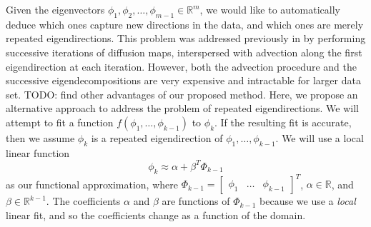\documentclass[preprint]{elsarticle}
\begin{document}
Given the eigenvectors $\phi_1, \phi_2, \dots, \phi_{m-1} \in \mathbb{R}^m$, we would like to automatically deduce which ones capture new directions in the data, and which ones are merely repeated eigendirections. 
%
This problem was addressed previously in \cite{...} by performing successive iterations of diffusion maps, interspersed with advection along the first eigendirection at each iteration. 
%
However, both the advection procedure and the successive eigendecompositions are very expensive and intractable for larger data set. 
TODO: find other advantages of our proposed method. 
%
Here, we propose an alternative approach to address the problem of repeated eigendirections. 
%
We will attempt to fit a function $f(\phi_1, \dots, \phi_{k-1})$ to $\phi_{k}$. 
%
If the resulting fit is accurate, then we assume $\phi_{k}$ is a repeated eigendirection of $\phi_1, \dots, \phi_{k-1}$. 
%
We will use a local linear function 
\begin{equation}
\phi_k \approx \alpha + \beta^T \Phi_{k-1}
\end{equation}
%
as our functional approximation, where 
%
$\Phi_{k-1} = \begin{bmatrix} \phi_1 & \dots & \phi_{k-1} \end{bmatrix}^T$,
$\alpha \in \mathbb{R}$, and $\beta \in \mathbb{R}^{k-1}$. 
%
The coefficients $\alpha$ and $\beta$ are functions of $\Phi_{k-1}$ because we use a {\em local} linear fit, and so the coefficients change as a function of the domain. 
\end{document}
